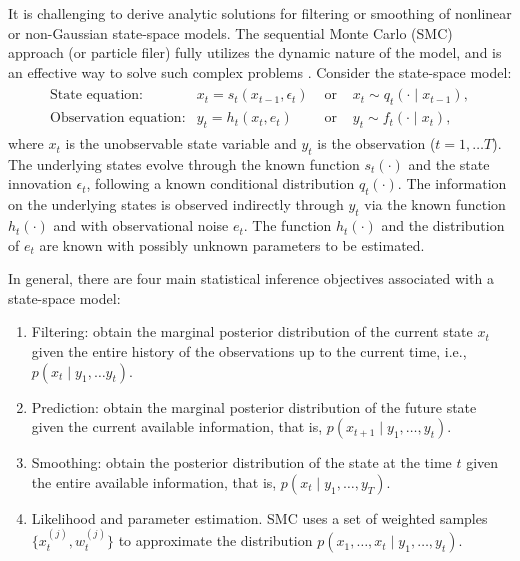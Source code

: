 It is challenging to derive analytic solutions for filtering or smoothing of
nonlinear or non-Gaussian state-space models.  The sequential Monte Carlo (SMC) approach
(or particle filer) fully utilizes the dynamic nature of the model, and is an effective way to solve such complex problems \citep{tsay2018}. Consider the state-space model:
\begin{align*}
\begin{array}{lccc}
\mbox{State equation:}	&x_t=s_t(x_{t-1},\epsilon_t) &\mbox{ or } &x_t \sim q_t(\cdot \mid x_{t-1}),\\
\mbox{Observation equation:}&y_t=h_t(x_t, e_t) &\mbox{ or } & y_t\sim f_t(\cdot \mid x_t),
\end{array}
\end{align*}
where $x_t$ is the unobservable state variable and $y_t$ is the observation ($t=1,\ldots T$).
The underlying states evolve through the known function $s_t(\cdot)$ and the state innovation
 $\epsilon_t$, following a known conditional distribution $q_t(\cdot)$. The information on the underlying states is observed indirectly through $y_t$ via the known function $h_t(\cdot)$ and with
 observational noise $e_t$. The function $h_t(\cdot)$ and the distribution of $e_t$ are known with
 possibly unknown parameters to be estimated.

In general, there are four main statistical inference objectives associated with a state-space model:
\begin{enumerate}
\item Filtering: obtain the marginal posterior distribution of the current state $x_t$ given the entire history of the observations up to the current time, i.e., $p(x_t \mid y_1, \ldots y_t)$.
\item Prediction: obtain the marginal posterior distribution of the future state given the
current available information,  that is,  $p(x_{t+1}\mid y_1,\ldots, y_t)$.
\item Smoothing: obtain the posterior distribution of the state at the time $t$ given the entire available information, that is, $p(x_{t} \mid y_1,\ldots, y_T)$.
\item Likelihood and parameter estimation. SMC uses a set of weighted samples $\{x_t^{(j)},w_t^{(j)}\}$ to approximate the distribution $p(x_1,\ldots, x_t \mid y_1,\ldots, y_t)$.
\end{enumerate}

